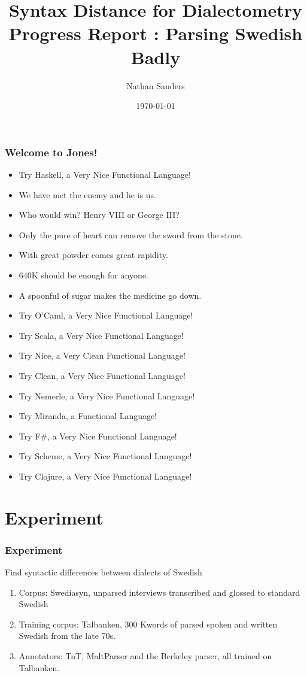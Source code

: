 \documentclass{beamer}
\title{Syntax Distance for Dialectometry \\ Progress Report : Parsing
  Swedish Badly}
\author{Nathan Sanders}
\date{\today}
\begin{document}
\begin{frame}
  \frametitle{Welcome to Jones!}

  \begin{itemize}
  \item Try Haskell, a Very Nice Functional Language!
  \item We have met the enemy and he is us.
  \item  Who would win? Henry VIII or George III?
  \item  Only the pure of heart can remove the sword from the stone.
  \item With great powder comes great rapidity.
  \item  640K should be enough for anyone.
  \item A spoonful of sugar makes the medicine go down.
  \item Try O'Caml, a Very Nice Functional Language!
  \item Try Scala, a Very Nice Functional Language!
  \item Try Nice, a Very Clean Functional Language!
  \item Try Clean, a Very Nice Functional Language!
  \item Try Nemerle, a Very Nice Functional Language!
  \item Try Miranda\texttrademark, a Functional Language!
  \item Try F\#, a Very Nice Functional Language!
  \item Try Scheme, a Very Nice Functional Language!
  \item Try Clojure, a Very Nice Functional Language!
  \end{itemize}
\end{frame}

\frame{\titlepage}
\section{Experiment}
\begin{frame}
  \frametitle{Experiment}
  Find syntactic differences between dialects of Swedish
  \begin{enumerate}
  \item Corpus: Swediasyn, unparsed interviews transcribed and glossed
    to standard Swedish
  \item Training corpus: Talbanken, 300 Kwords of parsed spoken and
    written Swedish from the late 70s.
  \item Annotators: TnT, MaltParser and the Berkeley parser, all
    trained on Talbanken.
  \end{enumerate}
\end{frame}
\end{document}
